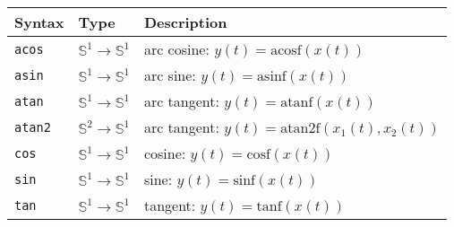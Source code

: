 \begin{tabular}{|l|l|l|}

	\hline
	\textbf{Syntax}    & \textbf{Type}                             & \textbf{Description}                                                                    \\
	\hline

	\texttt{acos}      & $\mathbb{S}^{1}\rightarrow\mathbb{S}^{1}$ & arc cosine: $y(t)=\mathrm{acosf}(x(t))$                                                 \\
	\texttt{asin}      & $\mathbb{S}^{1}\rightarrow\mathbb{S}^{1}$ & arc sine: $y(t)=\mathrm{asinf}(x(t))$                                                   \\
	\texttt{atan}      & $\mathbb{S}^{1}\rightarrow\mathbb{S}^{1}$ & arc tangent: $y(t)=\mathrm{atanf}(x(t))$                                                \\
	\texttt{atan2}     & $\mathbb{S}^{2}\rightarrow\mathbb{S}^{1}$ & arc tangent: $y(t)=\mathrm{atan2f}(x_{1}(t), x_{2}(t))$                                 \\

	\texttt{cos}       & $\mathbb{S}^{1}\rightarrow\mathbb{S}^{1}$ & cosine: $y(t)=\mathrm{cosf}(x(t))$                                                      \\
	\texttt{sin}       & $\mathbb{S}^{1}\rightarrow\mathbb{S}^{1}$ & sine: $y(t)=\mathrm{sinf}(x(t))$                                                        \\
	\texttt{tan}       & $\mathbb{S}^{1}\rightarrow\mathbb{S}^{1}$ & tangent: $y(t)=\mathrm{tanf}(x(t))$                                                     \\


\end{tabular}
